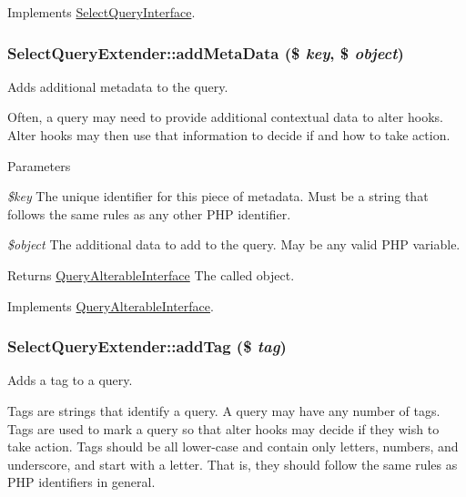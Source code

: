 Implements \hyperlink{interfaceSelectQueryInterface_a974ba99af27e9b77d7f5fc69ec81bd45}{SelectQueryInterface}.\hypertarget{classSelectQueryExtender_a4ca41f7412e9f35bfd61c0c0e387c7f9}{
\subsubsection[{addMetaData}]{\setlength{\rightskip}{0pt plus 5cm}SelectQueryExtender::addMetaData (\$ {\em key}, \/  \$ {\em object})}}
\label{classSelectQueryExtender_a4ca41f7412e9f35bfd61c0c0e387c7f9}
Adds additional metadata to the query.

Often, a query may need to provide additional contextual data to alter hooks. Alter hooks may then use that information to decide if and how to take action.


\begin{DoxyParams}{Parameters}
\item[{\em \$key}]The unique identifier for this piece of metadata. Must be a string that follows the same rules as any other PHP identifier. \item[{\em \$object}]The additional data to add to the query. May be any valid PHP variable.\end{DoxyParams}
\begin{DoxyReturn}{Returns}
\hyperlink{interfaceQueryAlterableInterface}{QueryAlterableInterface} The called object. 
\end{DoxyReturn}


Implements \hyperlink{interfaceQueryAlterableInterface_a4551fab9d5d25eeed040fdac7c8be4ae}{QueryAlterableInterface}.\hypertarget{classSelectQueryExtender_a3b2d7ff719982bd817dbe29d98c732db}{
\subsubsection[{addTag}]{\setlength{\rightskip}{0pt plus 5cm}SelectQueryExtender::addTag (\$ {\em tag})}}
\label{classSelectQueryExtender_a3b2d7ff719982bd817dbe29d98c732db}
Adds a tag to a query.

Tags are strings that identify a query. A query may have any number of tags. Tags are used to mark a query so that alter hooks may decide if they wish to take action. Tags should be all lower-\/case and contain only letters, numbers, and underscore, and start with a letter. That is, they should follow the same rules as PHP identifiers in general.


